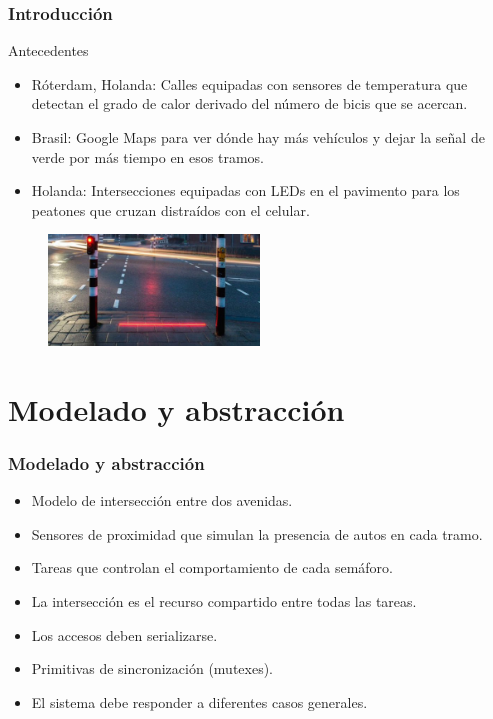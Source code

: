 \begin{frame}
\frametitle{Introducción}
\begin{block}{Antecedentes}
	\begin{itemize}
		\item Róterdam, Holanda: Calles equipadas con sensores de temperatura que detectan el grado de calor derivado del número de bicis que se acercan.
		\item Brasil: Google Maps para ver dónde hay más vehículos y dejar la señal de verde por más tiempo en esos tramos.
		\item Holanda: Intersecciones equipadas con LEDs en el pavimento para los peatones que cruzan distraídos con el celular.
	\end{itemize}

       \begin{figure}[htbp]
               \centering
               \includegraphics[width=0.5\textwidth]{diagramas/antecedente1.jpg}
       \end{figure}
\end{block}
\end{frame}

\section{Modelado y abstracción}

\begin{frame}
\frametitle{Modelado y abstracción}
\begin{block}{}
	\begin{itemize}
		\item Modelo de intersección entre dos avenidas.
		\item Sensores de proximidad que simulan la presencia de autos en cada tramo.
		\item Tareas que controlan el comportamiento de cada semáforo.
		\item La intersección es el recurso compartido entre todas las tareas.
		\item Los accesos deben serializarse.
		\item Primitivas de sincronización (mutexes).
		\item El sistema debe responder a diferentes casos generales.
	\end{itemize}
\end{block}
\end{frame}

